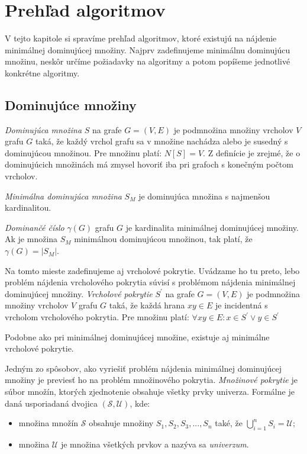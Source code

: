 \chapter{Prehľad algoritmov}\label{chap:algoritmy}

V tejto kapitole si spravíme prehľad algoritmov, ktoré existujú na nájdenie 
minimálnej dominujúcej množiny. Najprv zadefinujeme minimálnu dominujúcu 
množinu, neskôr určíme požiadavky na algoritmy a potom popíšeme jednotlivé 
konkrétne algoritmy.

\section{Dominujúce množiny}

\emph{Dominujúca množina} $S$ na grafe $G = (V, E)$ je podmnožina množiny 
vrcholov $V$ grafu $G$ taká, že každý vrchol grafu sa v množine nachádza 
alebo je susedný s dominujúcou množinou. Pre množinu platí: $N[S] = V$. 
Z definície je zrejmé, že o dominujúcich množinách má zmysel hovoriť iba pri 
grafoch s konečným počtom vrcholov.

\emph{Minimálna dominujúca množina} $S_M$ je dominujúca množina s najmenšou 
kardinalitou.

\emph{Dominančé číslo} $\gamma (G)$ grafu $G$ je kardinalita minimálnej 
dominujúcej množiny. Ak je množina $S_M$ minimálnou dominujúcou množinou, tak 
platí, že $\gamma (G) = |S_M|$.

Na tomto mieste zadefinujeme aj vrcholové pokrytie. Uvádzame ho tu preto, lebo 
problém nájdenia vrcholového pokrytia súvisí s problémom nájdenia minimálnej 
dominujúcej množiny. \emph{Vrcholové pokrytie} $S^\prime$ na grafe $G = (V, E)$ 
je podmnožina množiny vrcholov $V$ grafu $G$ taká, že každá hrana $xy \in E$ 
je incidentná s vrcholom vrcholového pokrytia. Pre množinu platí: 
$\forall xy \in E: x \in S^\prime \vee y \in S^\prime $

Podobne ako pri minimálnej dominujúcej množine, existuje aj minimálne vrcholové 
pokrytie.

Jedným zo spôsobov, ako vyriešiť problém nájdenia minimálnej dominujúcej 
množiny je previesť ho na problém množinového pokrytia. \emph{Množinové 
pokrytie} je súbor množín, ktorých zjednotenie obsahuje všetky prvky univerza. 
Formálne je daná usporiadaná dvojica $(\mathcal{S}, \mathcal{U})$, kde:

\begin{itemize}
	\item množina množín $\mathcal{S}$ obsahuje množiny $S_1, S_2, S_3, ..., 
		S_n$ také, že $\bigcup_{i = 1}^{n} S_i = \mathcal{U}$;
	\item množina $\mathcal{U}$ je množina všetkých prvkov a nazýva sa 
		\emph{univerzum}.
\end{itemize}

